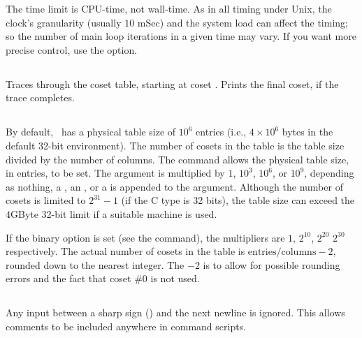 The time limit is CPU-time, not wall-time.
As in all timing under Unix, the clock's granularity (usually $10$ mSec)
  and the system load can affect the timing; so the number of main loop
  iterations in a given time may vary.
If you want more precise control, use the  option.

\subsection{}

Traces  through the coset table, starting at coset .
Prints the final coset, if the trace completes.

\subsection{}

By default, \ace\ has a physical table size of $10^6$ entries (i.e., 
  $4 \times 10^6$ bytes in the default 32-bit environment).
The number of cosets in the table is the table size divided by the number
  of columns.
The  command allows the physical table size, in entries, to be
  set.
The argument is multiplied by $1$, $10^3$\kern-2pt, $10^6$\kern-2pt, or 
  $10^9$\kern-2pt, depending as nothing, a , an , or a 
   is appended to the argument.
Although the number of cosets is limited to $2^{31}-1$ (if the C 
  type is 32 bits), the table size can exceed the $4$GByte 32-bit limit if
  a suitable machine is used.

If the binary option is set (see the  command), the multipliers
  are $1$, $2^{10}$\kern-2pt, $2^{20}$ \amp $2^{30}$ respectively.
The actual number of cosets in the table is
  $\mathrm{entries}/\mathrm{columns} -2$, rounded down to the nearest
  integer.
The $-2$ is to allow for possible rounding errors and the fact that coset
  \#0 is not used.

\subsection{}

Any input between a sharp sign (\ttt{\#}) and the next newline is ignored.
This allows comments to be included anywhere in command scripts.

